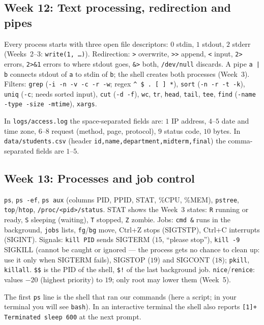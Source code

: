 \documentclass[11pt,a4paper]{article}
\newcommand{\cmd}[1]{\texttt{#1}}
\begin{document}
\subsection{Week 12: Text processing, redirection and pipes}
Every process starts with three open file descriptors: $0$ stdin, $1$ stdout, $2$ stderr (Weeks~2--3: \cmd{write(1, \dots)}). Redirection: \cmd{>} overwrite, \cmd{>>} append, \cmd{<} input, \cmd{2>} errors, \cmd{2>\&1} errors to where stdout goes, \cmd{\&>} both, \cmd{/dev/null} discards. A pipe \cmd{a | b} connects stdout of \texttt{a} to stdin of \texttt{b}; the shell creates both processes (Week~3). Filters: \cmd{grep} (\cmd{-i -n -v -c -r -w}; regex \texttt{\^{} \$ . [ ] *}), \cmd{sort} (\cmd{-n -r -t -k}), \cmd{uniq} (\cmd{-c}; needs sorted input), \cmd{cut} (\cmd{-d -f}), \cmd{wc}, \cmd{tr}, \cmd{head}, \cmd{tail}, \cmd{tee}, \cmd{find} (\cmd{-name -type -size -mtime}), \cmd{xargs}.

In \texttt{logs/access.log} the space-separated fields are: $1$ IP address, $4$--$5$ date and time zone, $6$--$8$ request (method, page, protocol), $9$ status code, $10$ bytes. In \texttt{data/students.csv} (header \texttt{id,name,department,midterm,final}) the comma-separated fields are $1$--$5$.

\subsection{Week 13: Processes and job control}
\cmd{ps}, \cmd{ps -ef}, \cmd{ps aux} (columns PID, PPID, STAT, \%CPU, \%MEM), \cmd{pstree}, \cmd{top}/\cmd{htop}, \texttt{/proc/<pid>/status}. STAT shows the Week~3 states: \texttt{R} running or ready, \texttt{S} sleeping (waiting), \texttt{T} stopped, \texttt{Z} zombie. Jobs: \cmd{cmd \&} runs in the background, \cmd{jobs} lists, \cmd{fg}/\cmd{bg} move, Ctrl+Z stops (SIGTSTP), Ctrl+C interrupts (SIGINT). Signals: \cmd{kill PID} sends SIGTERM ($15$, ``please stop''), \cmd{kill -9} SIGKILL (cannot be caught or ignored --- the process gets no chance to clean up: use it only when SIGTERM fails), SIGSTOP ($19$) and SIGCONT ($18$); \cmd{pkill}, \cmd{killall}. \texttt{\$\$} is the PID of the shell, \texttt{\$!} of the last background job. \cmd{nice}/\cmd{renice}: values $-20$ (highest priority) to $19$; only root may lower them (Week~5).

The first \cmd{ps} line is the shell that ran our commands (here a script; in your terminal you will see \texttt{bash}). In an interactive terminal the shell also reports \texttt{[1]+ Terminated sleep 600} at the next prompt.
\end{document}
